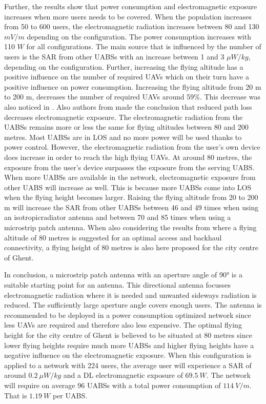 \documentclass[twocolumn]{phdsymp} %
\begin{document}
Further, the results show that power 
consumption and electromagnetic exposure increases when more users needs to be covered.
When the population increases from 50 to 600 users, 
the electromagnetic radiation increases between 80 and 130 $mV/m$ depending
on the configuration. The power consumption increases with 110 $W$ for all configurations. 
The main source that is influenced by the number of users is the \gls{SAR} from other UABSs with an increase between 1 and 3 $\mu W/kg$, depending on 
the configuration.
Further, increasing the flying altitude has a positive influence on the number of required \gls{UAV}s which on their 
turn have a positive influence on power consumption. Increasing the flying altitude from 20 m to 200 m, decreases the number 
of required \gls{UAV}s around 59\%. This decrease was also noticed in \cite{J2}.
Also authors from \cite{J17_kuehn2019modelling} made the conclusion that reduced path loss decreases electromagnetic exposure.
The electromagnetic radiation from the \gls{UABS}s remains more or less the same for flying altitudes between 80 and 200 metres. Most 
\gls{UABS}s are in \gls{LOS} and no more power will be used thanks to power control.
However, the electromagnetic radiation from the user's own device does increase in order to reach the high flying \gls{UAV}s.
At around 80 metres, the exposure from the  user's device surpasses the exposure from the serving \gls{UABS}.
When more \gls{UABS}s are available in the network, electromagnetic exposure from other \gls{UABS} will increase as well.
This is because more \gls{UABS}s come into \gls{LOS} when the flying height becomes larger. Raising the flying altitude from 20 to 200 m will increase the \gls{SAR} from other 
\gls{UABS}s between 46 and 49 times when using an \gls{isotropicradiator} antenna and between 70 and 85 times when using a microstrip patch antenna.
When also considering the results from \cite{U1} where a flying altitude of  
80 metres is suggested for an optimal access and backhaul connectivity, a flying height 
of 80 metres is also here proposed for the city centre of Ghent.

In conclusion, a microstrip patch antenna with an aperture angle of \ang{90} is a suitable starting point for an antenna. 
This directional antenna focusses electromagnetic radiation where it is needed and unwanted sideways radiation 
is reduced.
The sufficiently large aperture angle covers enough users. The antenna is recommended to be deployed in a power consumption 
optimized network since less \gls{UAV}s are required and therefore also less expensive.
The optimal flying height for the city centre of Ghent is believed to be situated at 80 metres since lower flying heights require much more \gls{UABS}s and
higher flying heights have a negative influence on the electromagnetic exposure.  
When this configuration is applied to a network with 224 users, the average user will experience a \gls{SAR} of around $0.2\ \mu W/kg$ and
 a \gls{DL} electromagnetic exposure of $69.5\ W$. The network will require on average 96 \gls{UABS}s with a total
power consumption of $114\ V/m$. That is $1.19\ W$ per \gls{UABS}.
\end{document}
